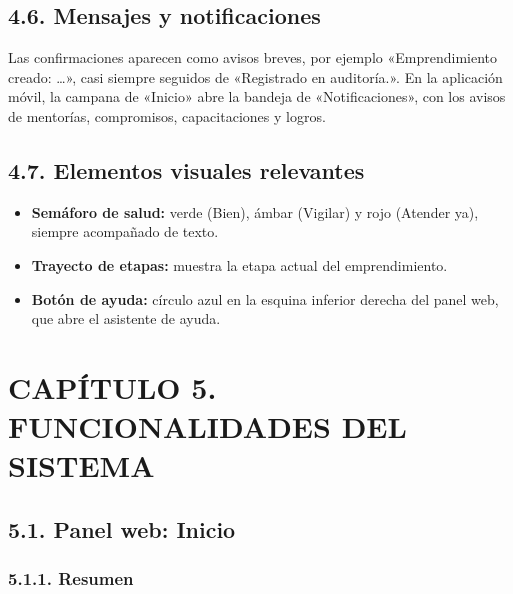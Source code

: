 \documentclass[12pt,letterpaper]{article}
\begin{document}
\subsection*{4.6. Mensajes y notificaciones}


Las confirmaciones aparecen como avisos breves, por ejemplo «Emprendimiento creado: \ldots{}», casi siempre seguidos de «Registrado en auditoría.». En la aplicación móvil, la campana de «Inicio» abre la bandeja de «Notificaciones», con los avisos de mentorías, compromisos, capacitaciones y logros.

\subsection*{4.7. Elementos visuales relevantes}


\begin{itemize}
\item \textbf{Semáforo de salud:} verde (Bien), ámbar (Vigilar) y rojo (Atender ya), siempre acompañado de texto.
\item \textbf{Trayecto de etapas:} muestra la etapa actual del emprendimiento.
\item \textbf{Botón de ayuda:} círculo azul en la esquina inferior derecha del panel web, que abre el asistente de ayuda.
\end{itemize}

\clearpage

\section*{CAPÍTULO 5. FUNCIONALIDADES DEL SISTEMA}


\subsection*{5.1. Panel web: Inicio}


\subsubsection*{5.1.1. Resumen}
\end{document}
